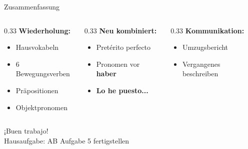 \documentclass[aspectratio=169, 11pt]{beamer}
\newcommand{\seriftext}[1]{{\fontfamily{ppl}\selectfont #1}}
\newcommand{\es}[1]{\seriftext{\textbf{#1}}}
\begin{document}
\begin{frame}{Zusammenfassung}
    \begin{columns}
        \begin{column}{0.33\textwidth}
            \textbf{Wiederholung:}
            \begin{itemize}
                \item Hausvokabeln
                \item 6 Bewegungsverben
                \item Präpositionen
                \item Objektpronomen
            \end{itemize}
        \end{column}
        \begin{column}{0.33\textwidth}
            \textbf{Neu kombiniert:}
            \begin{itemize}
                \item Pretérito perfecto
                \item Pronomen vor \es{haber}
                \item \es{Lo he puesto...}
            \end{itemize}
        \end{column}
        \begin{column}{0.33\textwidth}
            \textbf{Kommunikation:}
            \begin{itemize}
                \item Umzugsbericht
                \item Vergangenes beschreiben
            \end{itemize}
        \end{column}
    \end{columns}

    \vspace{15pt}

    \begin{center}
    \end{center}
\end{frame}


{
\begin{frame}[plain]
    \vfill
    \begin{center}
        {¡Buen trabajo!}\\[20pt]
        {\small Hausaufgabe: AB Aufgabe 5 fertigstellen}
    \end{center}
    \vfill
\end{frame}
}
\end{document}
